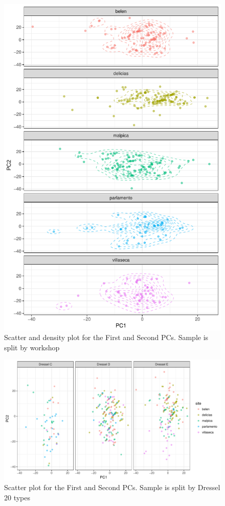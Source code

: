 \documentclass[review]{elsarticle}
\begin{document}
\begin{figure}[htp]
	\centering
\includegraphics[width=\linewidth]{figs/pca}
\caption{Scatter and density plot for the First and Second PCs. Sample is split by workshop}
\label{pca}
\end{figure} 


\begin{figure}[htp]
	\centering
\includegraphics[width=\linewidth]{figs/dresseltypes}
\caption{Scatter plot for the First and Second PCs. Sample is split by Dressel 20 types}
\label{dressel}
\end{figure} 
\end{document}
